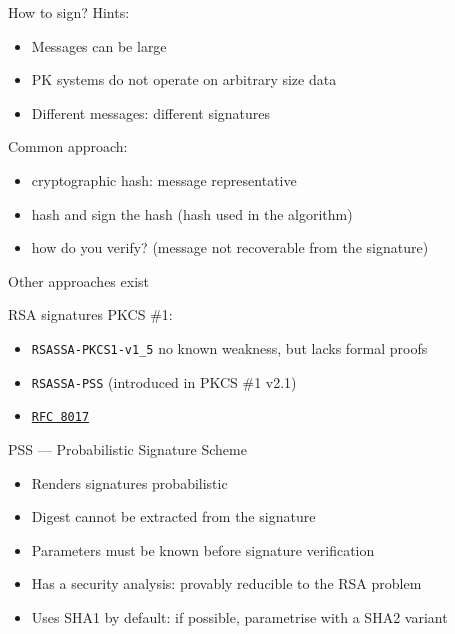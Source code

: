 \begin{frame}{How to sign?}
  Hints:
  \begin{itemize}[<+(1)->]
    \item Messages can be large
    \item PK systems do not operate on arbitrary size data
    \item Different messages: different signatures
  \end{itemize}

  \pause
  Common approach:
  \begin{itemize}[<+(1)->]
    \item cryptographic hash: message representative
    \item hash and sign the hash (hash used in the algorithm)
    \item how do you verify? (message not recoverable from the signature)
  \end{itemize}

  \pause
  Other approaches exist
\end{frame}

\begin{frame}{RSA signatures}
  \pause
  PKCS \#1:
  \begin{itemize}[<+(1)->]
    \item \texttt{RSASSA-PKCS1-v1\_5} no known weakness, but lacks formal proofs
    \item \texttt{RSASSA-PSS} (introduced in PKCS \#1 v2.1)
    \item \href{https://datatracker.ietf.org/doc/html/rfc8017}{\texttt{RFC 8017}}
  \end{itemize}

  \pause
  PSS --- Probabilistic Signature Scheme
  \begin{itemize}[<+(1)->]
    \item Renders signatures probabilistic
    \item Digest cannot be extracted from the signature
    \item Parameters must be known before signature verification
    \item Has a security analysis: provably reducible to the RSA problem
    \item Uses SHA1 by default: if possible, parametrise with a SHA2 variant
  \end{itemize}
\end{frame}

